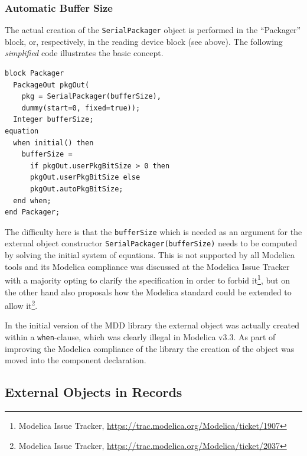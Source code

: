 \documentclass{resources/modelica}
\newcommand{\modelica}[1]{\lstinline[language=modelica]|#1|}
\begin{document}
\subsubsection{Automatic Buffer Size}
\label{sec:Automatic Buffer Size}

The actual creation of the \modelica{SerialPackager} object is performed in
the ``Packager'' block, or, respectively, in the reading device block (see
above). The following \emph{simplified} code illustrates the basic concept.
\begin{lstlisting}[language=modelica]
block Packager
  PackageOut pkgOut(
    pkg = SerialPackager(bufferSize),
    dummy(start=0, fixed=true));
  Integer bufferSize;
equation
  when initial() then
    bufferSize =
      if pkgOut.userPkgBitSize > 0 then
      pkgOut.userPkgBitSize else
      pkgOut.autoPkgBitSize;
  end when;
end Packager;
\end{lstlisting}
The difficulty here is that the \modelica{bufferSize} which is needed as an
argument for the external object constructor
\modelica{SerialPackager(bufferSize)} needs to be computed by solving the
initial system of equations. This is not supported by all Modelica tools and its
Modelica compliance was discussed at the Modelica Issue Tracker with a majority
opting to clarify the specification in order to forbid it\footnote{Modelica Issue Tracker,
\url{https://trac.modelica.org/Modelica/ticket/1907}}, but on the other hand
also proposals how the Modelica standard could be extended to allow
it\footnote{Modelica Issue Tracker,
\url{https://trac.modelica.org/Modelica/ticket/2037}}.

In the initial version of the MDD library the external object was actually
created within a \modelica{when}-clause,
which was clearly illegal in Modelica v3.3. As part of improving the Modelica
compliance of the library the creation of the object was moved into the
component declaration.

\subsection{External Objects in Records}
\label{sec:External Objects in Records}
\end{document}
